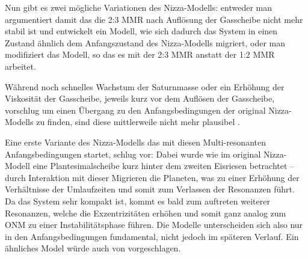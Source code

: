 \documentclass[12pt,a4paper,twoside,open=right,bibliography=totoc]{scrbook}
\renewcommand{\cite}{ \citep}
\begin{document}
Nun gibt es zwei mögliche Variationen des Nizza-Modells: entweder man argumentiert damit das die 2:3 MMR nach Auflösung der Gasscheibe nicht mehr stabil ist und entwickelt ein Modell, wie sich dadurch das System in einen Zustand ähnlich dem Anfangszustand des Nizza-Modells migriert, oder man modifiziert das Modell, so das es mit der 2:3 MMR anstatt der 1:2 MMR arbeitet.

Während \cite{Morbidelli2007a} noch schnelles Wachstum der Saturnmasse oder ein Erhöhung der Viskosität der Gasscheibe, jeweils kurz vor dem Auflösen der Gasscheibe, vorschlug um einen Übergang zu den Anfangsbedingungen der original Nizza-Modells zu finden, sind diese mittlerweile nicht mehr plausibel\cite{Pierens2008,Zhang2010,Levison2011}. 

Eine erste Variante des Nizza-Modells das mit diesen Multi-resonanten Anfangsbedingungen startet, schlug \cite{Morbidelli2007b} vor:
Dabei wurde wie im original Nizza-Modell eine Plantesimalscheibe kurz hinter dem zweiten Eisriesen betrachtet -- durch Interaktion mit dieser Migrieren die Planeten, was zu einer Erhöhung der Verhältnisse der Umlaufzeiten und somit zum Verlassen der Resonanzen führt.
Da das System sehr kompakt ist, kommt es bald zum auftreten weiterer Resonanzen, welche die Exzentrizitäten erhöhen und somit ganz analog zum ONM zu einer Instabilitätsphase führen. Die Modelle unterscheiden sich also nur in den Anfangsbedingungen fundamental, nicht jedoch im späteren Verlauf.
Ein ähnliches Model würde auch von \cite{Batygin2010} vorgeschlagen.
\end{document}
